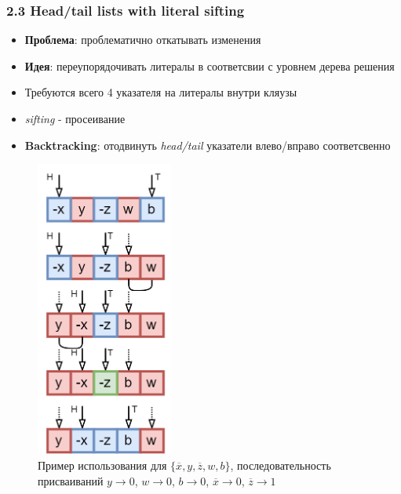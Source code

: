 \documentclass[aspectratio=169,xcolor=table,english]{beamer}
\begin{document}
\begin{frame}[fragile] \frametitle{2.3 Head/tail lists with literal sifting}
    \begin{minipage}[m]{0.55\linewidth}
        \begin{itemize}
            \item \textbf{Проблема}: проблематично откатывать изменения
            \item \textbf{Идея}: переупорядочивать литералы в соответсвии с уровнем дерева решения
            \item Требуются всего 4 указателя на литералы внутри кляузы 
            \item \textit{sifting} - просеивание
            \item \textbf{Backtracking}: отодвинуть \textit{head/tail} указатели влево/вправо соответсвенно 
        \end{itemize}
    \end{minipage}\hfill
    \begin{minipage}[m]{0.4\linewidth}
        \begin{figure}
            \centering
            \includegraphics[width=0.4\textwidth]{figures/head tail sifting.png}
            \caption{Пример использования для $\{\overline{x},y,\overline{z},w,b\}$, последовательность присваиваний $y \rightarrow 0$, $w \rightarrow 0$, $b \rightarrow 0$, $\overline{x} \rightarrow 0$, $\overline{z} \rightarrow 1$}
        \end{figure}
    \end{minipage}
\end{frame}
\end{document}
